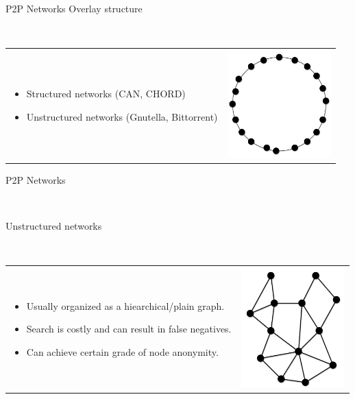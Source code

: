 \documentclass[12pt]{beamer}
\renewcommand{\frametitle}[1]{\vspace{0.2cm}\begin{huge}#1\end{huge}\\}
\renewcommand{\framesubtitle}[1]{\vspace{0.4cm} \hspace{0.4cm}\begin{large}#1\end{large}\\}
\begin{document}
    \begin{frame}
    \frametitle{P2P Networks Overlay structure}
    \begin{table}
    \begin{tabular}{p{7cm}p{3cm}}
    \begin{itemize}
        \item Structured networks (CAN, CHORD)
        \item Unstructured networks (Gnutella, Bittorrent)
    \end{itemize}
    &
    \vspace{1.5cm}
    \includegraphics[width=4cm]{../../presentacion/img/p2p-structured}\\
    \end{tabular}
    \end{table}
    \end{frame}

    \begin{frame}
    \frametitle{P2P Networks}
    \framesubtitle{Unstructured networks}
    \begin{table}
    \begin{tabular}{p{7cm}p{3cm}}
    \begin{itemize}
        \item Usually organized as a hiearchical/plain graph.
        \item Search is costly and can result in false negatives.
        \item Can achieve certain grade of node anonymity. 
    \end{itemize}
    &
    \vspace{1.5cm}
    \includegraphics[width=4cm]{../../presentacion/img/p2p-unstructured}\\
    \end{tabular}
    \end{table}
    \end{frame}
\end{document}
